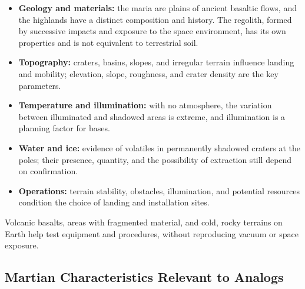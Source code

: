 \documentclass[12pt,letterpaper]{article}
\begin{document}
\begin{itemize}
  \item \textbf{Geology and materials:} the maria are plains of ancient basaltic flows, and the highlands have a distinct composition and history. The regolith, formed by successive impacts and exposure to the space environment, has its own properties and is not equivalent to terrestrial soil.
  \item \textbf{Topography:} craters, basins, slopes, and irregular terrain influence landing and mobility; elevation, slope, roughness, and crater density are the key parameters.
  \item \textbf{Temperature and illumination:} with no atmosphere, the variation between illuminated and shadowed areas is extreme, and illumination is a planning factor for bases.
  \item \textbf{Water and ice:} evidence of volatiles in permanently shadowed craters at the poles; their presence, quantity, and the possibility of extraction still depend on confirmation.
  \item \textbf{Operations:} terrain stability, obstacles, illumination, and potential resources condition the choice of landing and installation sites.
\end{itemize}

Volcanic basalts, areas with fragmented material, and cold, rocky terrains on Earth help test equipment and procedures, without reproducing vacuum or space exposure.

\subsection{Martian Characteristics Relevant to Analogs}
\end{document}
